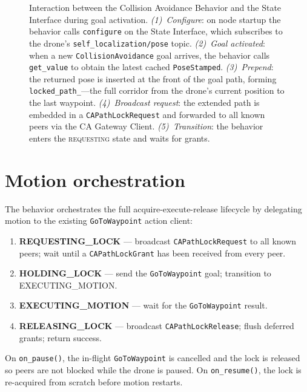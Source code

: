 \documentclass[deliverable]{csreport}
\renewcommand{\code}[1]{\texttt{\textcolor{CSMaroon}{#1}}}%
\begin{document}
\begin{figure}[tbh]
{\begin{tikzpicture}
\end{tikzpicture}
}%
\caption{Interaction between the Collision Avoidance Behavior and the State Interface during goal activation.
\textit{(1)~Configure}: on node startup the behavior calls \code{configure} on the State Interface, which subscribes to the drone's \code{self\_localization/pose} topic.
\textit{(2)~Goal activated}: when a new \code{CollisionAvoidance} goal arrives, the behavior calls \code{get\_value} to obtain the latest cached \code{PoseStamped}.
\textit{(3)~Prepend}: the returned pose is inserted at the front of the goal path, forming \code{locked\_path\_}---the full corridor from the drone's current position to the last waypoint.
\textit{(4)~Broadcast request}: the extended path is embedded in a \code{CAPathLockRequest} and forwarded to all known peers via the CA Gateway Client.
\textit{(5)~Transition}: the behavior enters the \textsc{requesting} state and waits for grants.}
\label{fig:ca_state_interface}
\end{figure}

\section{Motion orchestration}

The behavior orchestrates the full acquire-execute-release lifecycle by delegating motion to the existing \code{GoToWaypoint} action client:

\begin{enumerate}
  \item \textbf{REQUESTING\_LOCK} --- broadcast \code{CAPathLockRequest} to all known peers; wait until a \code{CAPathLockGrant} has been received from every peer.
  \item \textbf{HOLDING\_LOCK} --- send the \code{GoToWaypoint} goal; transition to EXECUTING\_MOTION.
  \item \textbf{EXECUTING\_MOTION} --- wait for the \code{GoToWaypoint} result.
  \item \textbf{RELEASING\_LOCK} --- broadcast \code{CAPathLockRelease}; flush deferred grants; return success.
\end{enumerate}

On \code{on\_pause()}, the in-flight \code{GoToWaypoint} is cancelled and the lock is released so peers are not blocked while the drone is paused. On \code{on\_resume()}, the lock is re-acquired from scratch before motion restarts.

\end{document}
